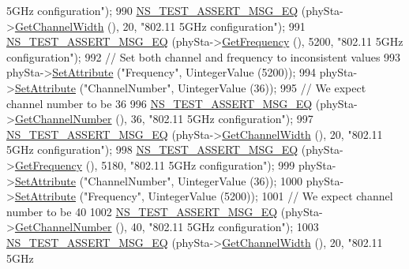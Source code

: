 \begin{DoxyCode}
{       5GHz configuration"});
990     \hyperlink{group__testing_ga2a9d78cffb3db8e867c35fff0b698cf5}{NS\_TEST\_ASSERT\_MSG\_EQ} (phySta->\hyperlink{classns3_1_1WifiPhy_a4a5d5009b3b3308f2baeed42a2007189}{GetChannelWidth} (), 20, \textcolor{stringliteral}{"802.11 5GHz
       configuration"});
991     \hyperlink{group__testing_ga2a9d78cffb3db8e867c35fff0b698cf5}{NS\_TEST\_ASSERT\_MSG\_EQ} (phySta->\hyperlink{classns3_1_1WifiPhy_ad2508d94faf22d690d6b8b4367934fd1}{GetFrequency} (), 5200, \textcolor{stringliteral}{"802.11 5GHz
       configuration"});
992     \textcolor{comment}{// Set both channel and frequency to inconsistent values}
993     phySta->\hyperlink{classns3_1_1ObjectBase_ac60245d3ea4123bbc9b1d391f1f6592f}{SetAttribute} (\textcolor{stringliteral}{"Frequency"}, UintegerValue (5200));
994     phySta->\hyperlink{classns3_1_1ObjectBase_ac60245d3ea4123bbc9b1d391f1f6592f}{SetAttribute} (\textcolor{stringliteral}{"ChannelNumber"}, UintegerValue (36));
995     \textcolor{comment}{// We expect channel number to be 36}
996     \hyperlink{group__testing_ga2a9d78cffb3db8e867c35fff0b698cf5}{NS\_TEST\_ASSERT\_MSG\_EQ} (phySta->\hyperlink{classns3_1_1WifiPhy_a5cf0ccf06109ace61db51c83e91b7e8d}{GetChannelNumber} (), 36, \textcolor{stringliteral}{"802.11
       5GHz configuration"});
997     \hyperlink{group__testing_ga2a9d78cffb3db8e867c35fff0b698cf5}{NS\_TEST\_ASSERT\_MSG\_EQ} (phySta->\hyperlink{classns3_1_1WifiPhy_a4a5d5009b3b3308f2baeed42a2007189}{GetChannelWidth} (), 20, \textcolor{stringliteral}{"802.11 5GHz
       configuration"});
998     \hyperlink{group__testing_ga2a9d78cffb3db8e867c35fff0b698cf5}{NS\_TEST\_ASSERT\_MSG\_EQ} (phySta->\hyperlink{classns3_1_1WifiPhy_ad2508d94faf22d690d6b8b4367934fd1}{GetFrequency} (), 5180, \textcolor{stringliteral}{"802.11 5GHz
       configuration"});
999     phySta->\hyperlink{classns3_1_1ObjectBase_ac60245d3ea4123bbc9b1d391f1f6592f}{SetAttribute} (\textcolor{stringliteral}{"ChannelNumber"}, UintegerValue (36));
1000     phySta->\hyperlink{classns3_1_1ObjectBase_ac60245d3ea4123bbc9b1d391f1f6592f}{SetAttribute} (\textcolor{stringliteral}{"Frequency"}, UintegerValue (5200));
1001     \textcolor{comment}{// We expect channel number to be 40}
1002     \hyperlink{group__testing_ga2a9d78cffb3db8e867c35fff0b698cf5}{NS\_TEST\_ASSERT\_MSG\_EQ} (phySta->\hyperlink{classns3_1_1WifiPhy_a5cf0ccf06109ace61db51c83e91b7e8d}{GetChannelNumber} (), 40, \textcolor{stringliteral}{"802.11
       5GHz configuration"});
1003     \hyperlink{group__testing_ga2a9d78cffb3db8e867c35fff0b698cf5}{NS\_TEST\_ASSERT\_MSG\_EQ} (phySta->\hyperlink{classns3_1_1WifiPhy_a4a5d5009b3b3308f2baeed42a2007189}{GetChannelWidth} (), 20, \textcolor{stringliteral}{"802.11 5GHz
}
\end{DoxyCode}
